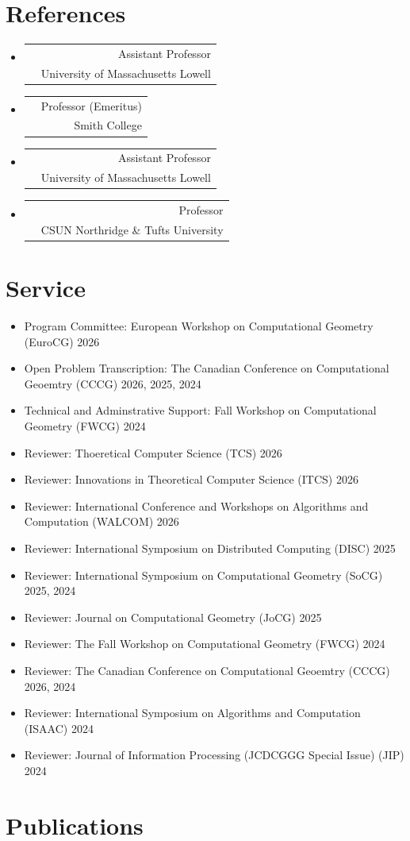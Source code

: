 \documentclass[letterpaper,11pt]{article}
\makeatletter
\newcommand{\resumeSubHeadingListStart}{\begin{itemize}[leftmargin=*]}
\newcommand{\resumeSubHeadingListEnd}{\end{itemize}}
\newcommand{\resumeSubheading}[4]{%
  \item[]%
  \begin{tabularx}{\textwidth}{>{\raggedright\arraybackslash}X@{\hspace{0.5em}}r}
    {\bfseries{\textsc{#1}}} & #2 \\[2pt]
    {\small #3}               & {\small #4} \\
  \end{tabularx}%
}
\newcommand{\resumeOneLine}[2]{%
  \item[] #1 #2
}
\makeatother
\begin{document}
\section{References}
\resumeSubHeadingListStart

\resumeSubheading{Hugo Akitaya}{Assistant Professor}{hugo\_akitaya@uml.edu}{University of Massachusetts Lowell}    
\resumeSubheading{Joseph O'Rourke}{Professor (Emeritus)}{jorourke@smith.edu}{Smith College}    
\resumeSubheading{Amanda Redlich}{Assistant Professor}{Amanda\_Redlich@uml.edu}{University of Massachusetts Lowell}    
\resumeSubheading{Csaba Tóth}{Professor}{csaba.toth@csun.edu}{CSUN Northridge \& Tufts University}    

\resumeSubHeadingListEnd

\section{Service}
\resumeSubHeadingListStart
  \resumeOneLine{Program Committee: European Workshop on Computational Geometry (EuroCG)}{
2026  
  }
  \resumeOneLine{Open Problem Transcription: The Canadian Conference on Computational Geoemtry (CCCG)}{
2026, 2025, 2024  
  }
  \resumeOneLine{Technical and Adminstrative Support: Fall Workshop on Computational Geometry (FWCG)}{
2024  
  }
  \resumeOneLine{Reviewer: Thoeretical Computer Science (TCS)}{
2026  
  }
  \resumeOneLine{Reviewer: Innovations in Theoretical Computer Science (ITCS)}{
2026  
  }
  \resumeOneLine{Reviewer: International Conference and Workshops on Algorithms and Computation (WALCOM)}{
2026  
  }
  \resumeOneLine{Reviewer: International Symposium on Distributed Computing (DISC)}{
2025  
  }
  \resumeOneLine{Reviewer: International Symposium on Computational Geometry (SoCG)}{
2025, 2024  
  }
  \resumeOneLine{Reviewer: Journal on Computational Geometry (JoCG)}{
2025  
  }
  \resumeOneLine{Reviewer: The Fall Workshop on Computational Geometry (FWCG)}{
2024  
  }
  \resumeOneLine{Reviewer: The Canadian Conference on Computational Geoemtry (CCCG)}{
2026, 2024  
  }
  \resumeOneLine{Reviewer: International Symposium on Algorithms and Computation (ISAAC)}{
2024  
  }
  \resumeOneLine{Reviewer: Journal of Information Processing (JCDCGGG Special Issue)  (JIP)}{
2024  
  }
\resumeSubHeadingListEnd

\section{Publications}
\end{document}
